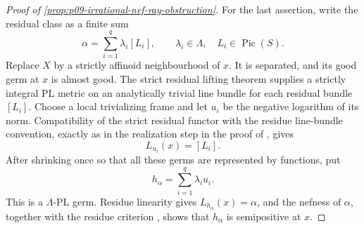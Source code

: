 \begin{proof}[Proof of \cref{prop:p09-irrational-nef-ray-obstruction}]
For the last assertion, write the residual class as a finite sum
\[
                         \alpha=\sum_{i=1}^{q}\lambda_i[L_i],
 \qquad
             \lambda_i\in\Lambda,\quad L_i\in\operatorname{Pic}(S).
\]
Replace \(X\) by a strictly affinoid neighbourhood of \(x\).  It is
separated, and its good germ at \(x\) is almost good.
The strict residual lifting theorem
\cite[Theorem~17.5.7(b)]{CLD25} supplies a strictly integral PL metric on
an analytically trivial line bundle for each residual bundle \([L_i]\).
Choose a local trivializing frame and let \(u_i\) be the negative logarithm
of its norm.  Compatibility of the strict residual functor with the residue
line-bundle convention, exactly as in the realization step in the proof of
\cite[Proposition~7.10]{GJR26}, gives
\[
                              L_{u_i}(x)=[L_i].
\]
After shrinking once so that all these germs are represented by functions,
put
\[
                              h_\alpha=\sum_{i=1}^{q}\lambda_i u_i.
\]
This is a \(\Lambda\)-PL germ.  Residue linearity
\cite[Lemma~6.18]{GJR26} gives \(L_{h_\alpha}(x)=\alpha\), and the nefness
of \(\alpha\), together with the residue criterion
\cite[Proposition~7.1]{GJR26}, shows that \(h_\alpha\) is semipositive at
\(x\).
\end{proof}

